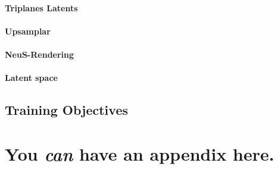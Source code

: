 \documentclass{article}
\theoremstyle{plain}
\theoremstyle{definition}
\theoremstyle{remark}
\begin{document}
\paragraph{Triplanes Latents}

\paragraph{Upsamplar}

\paragraph{NeuS-Rendering}

\paragraph{Latent space}

\subsection{Training Objectives}











\newpage
\appendix
\onecolumn
\section{You \emph{can} have an appendix here.}
\end{document}
